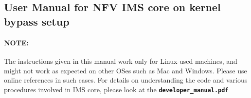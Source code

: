 \documentclass[hidelinks]{report}
\newcommand{\cf}[1] {
	\textbf{\texttt{#1}}
}
\begin{document}

\begin{center}
\section*{User Manual for NFV IMS core on kernel bypass setup}
\end{center}


\paragraph*{NOTE:} The instructions given in this manual work only for Linux-used machines, and might not work as expected
on other OSes such as Mac and Windows. Please use online references in such cases. For details on understanding the code and various procedures involved in IMS core, please look at the \cf{developer\_manual.pdf}
\end{document}
